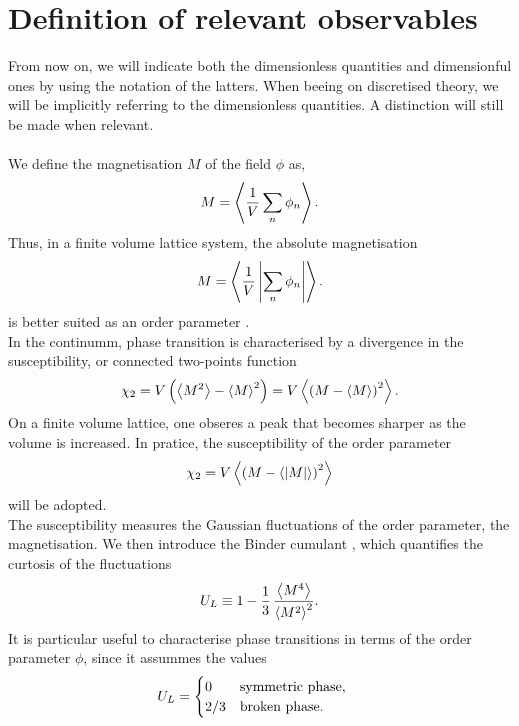 \section{Definition of relevant observables}
\label{sec:observables}
From now on, we will indicate both the dimensionless quantities and dimensionful ones by using the notation of the latters. When beeing on discretised theory, we will be implicitly referring to the dimensionless quantities. A distinction will still be made when relevant. \\~\\
We define the magnetisation $M$ of the field $\phi$ as,
\begin{equation*}
    M = \left\langle \frac{1}{V}\sum_n \phi_n \right\rangle.
\end{equation*}
Thus, in a finite volume lattice system, the absolute magnetisation
\begin{equation*}
    M = \left\langle \frac{1}{V}\left|\sum_n \phi_n\right| \right\rangle.
\end{equation*}
is better suited as an order parameter \cite{friedli_velenik_2017,gattringer_LQCD}. \\
In the continumm, phase transition is characterised by a divergence in the susceptibility, or connected two-points function
\begin{equation*}
    \chi_2 = V \left(\left\langle M^2 \right\rangle - \left\langle M \right\rangle^2\right) = V \left\langle \left(M-\left\langle M \right\rangle\right)^2 \right\rangle.
\end{equation*}
On a finite volume lattice, one obseres a peak that becomes sharper as the volume is increased. In pratice, the susceptibility of the order parameter 
\begin{equation*}
    \chi_2 = V \left\langle \left(M-\left\langle |M| \right\rangle\right)^2 \right\rangle
\end{equation*}
will be adopted. \\
The susceptibility measures the Gaussian fluctuations of the order parameter, the magnetisation. We then introduce the Binder cumulant \cite{binder2010monte}, which quantifies the curtosis of the fluctuations
\begin{equation*}
    U_L \equiv 1 - \frac{1}{3} \, \frac{\left\langle M^4 \right\rangle}{\left\langle M^2 \right\rangle^2}.
\end{equation*}
It is particular useful to characterise phase transitions in terms of the order parameter $\phi$, since it assummes the values 
\begin{equation*}
    U_L = \begin{cases}0 \quad \hphantom{/3} \text{symmetric phase}, \\ 2/3 \quad \text{broken phase}. \end{cases}
\end{equation*}
